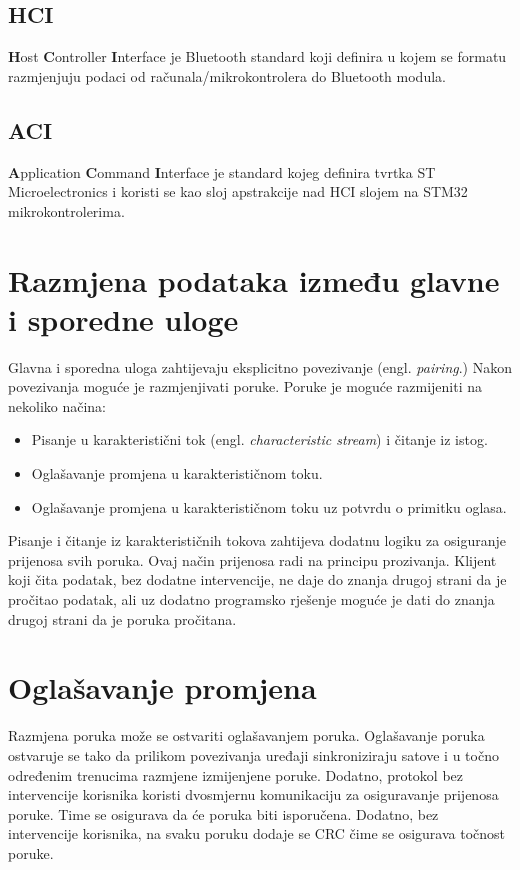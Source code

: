 \documentclass[times, utf8, diplomski]{diplomski}
\begin{document}
\subsection{HCI}
\textbf{H}ost \textbf{C}ontroller \textbf{I}nterface je Bluetooth standard koji definira u kojem se formatu razmjenjuju podaci od računala/mikrokontrolera do Bluetooth modula.

\subsection{ACI}
\textbf{A}pplication \textbf{C}ommand \textbf{I}nterface je standard kojeg definira tvrtka ST Microelectronics i koristi se kao sloj apstrakcije nad HCI slojem na STM32 mikrokontrolerima.


\section {Razmjena podataka između glavne i sporedne uloge}
Glavna i sporedna uloga zahtijevaju eksplicitno povezivanje (engl. \textit{pairing}.) Nakon povezivanja moguće je razmjenjivati poruke. Poruke je moguće razmijeniti na nekoliko načina:

\begin{itemize}
  \item Pisanje u karakteristični tok (engl. \textit{characteristic stream}) i čitanje iz istog.
  \item Oglašavanje promjena u karakterističnom toku.
  \item Oglašavanje promjena u karakterističnom toku uz potvrdu o primitku oglasa.
\end{itemize}

Pisanje i čitanje iz karakterističnih tokova zahtijeva dodatnu logiku za osiguranje prijenosa svih poruka. Ovaj način prijenosa radi na principu prozivanja.
Klijent koji čita podatak, bez dodatne intervencije, ne daje do znanja drugoj strani da je pročitao podatak,
ali uz dodatno programsko rješenje moguće je dati do znanja drugoj strani da je poruka pročitana.

\section {Oglašavanje promjena}
Razmjena poruka može se ostvariti oglašavanjem poruka. Oglašavanje poruka ostvaruje se tako da prilikom povezivanja uređaji sinkroniziraju satove i u točno određenim trenucima razmjene izmijenjene poruke. Dodatno, protokol bez intervencije korisnika koristi dvosmjernu komunikaciju za osiguravanje prijenosa poruke. Time se osigurava da će poruka biti isporučena. Dodatno, bez intervencije korisnika, na svaku poruku dodaje se CRC čime se osigurava točnost poruke.
\end{document}

